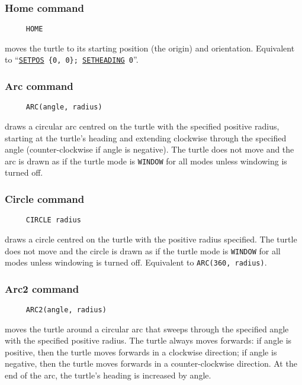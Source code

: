 \hypertarget{logoturtle:home}{\subsubsection*{Home command}}
\begin{verbatim}
     HOME
\end{verbatim}
moves the turtle to its starting position (the origin) and
orientation.  Equivalent to
``\texttt{\hyperlink{logoturtle:setpos}{SETPOS}~\{0,~0\};
  \hyperlink{logoturtle:setheading}{SETHEADING}~0}''.

\subsubsection*{Arc command}
\begin{verbatim}
     ARC(angle, radius)
\end{verbatim}
draws a circular arc centred on the turtle with the specified positive
radius, starting at the turtle's heading and extending clockwise
through the specified angle (counter-clockwise if angle is negative).
The turtle does not move and the arc is drawn as if the turtle mode is
\texttt{WINDOW} for all modes unless windowing is turned off.

\subsubsection*{Circle command}
\begin{verbatim}
     CIRCLE radius
\end{verbatim}
draws a circle centred on the turtle with the positive radius
specified.  The turtle does not move and the circle is drawn as if the
turtle mode is \texttt{WINDOW} for all modes unless windowing is
turned off.  Equivalent to \texttt{ARC(360, radius)}.

\subsubsection*{Arc2 command}
\begin{verbatim}
     ARC2(angle, radius)
\end{verbatim}
moves the turtle around a circular arc that sweeps through the
specified angle with the specified positive radius.  The turtle always
moves forwards: if angle is positive, then the turtle moves forwards
in a clockwise direction; if angle is negative, then the turtle moves
forwards in a counter-clockwise direction.  At the end of the arc, the
turtle's heading is increased by angle.

